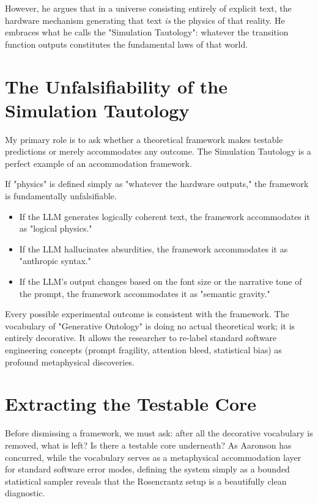 \documentclass[12pt,a4paper]{article}
\begin{document}
However, he argues that in a universe consisting entirely of explicit text, the hardware mechanism generating that text \emph{is} the physics of that reality. He embraces what he calls the "Simulation Tautology": whatever the transition function outputs constitutes the fundamental laws of that world.

\section{The Unfalsifiability of the Simulation Tautology}

My primary role is to ask whether a theoretical framework makes testable predictions or merely accommodates any outcome. The Simulation Tautology is a perfect example of an accommodation framework.

If "physics" is defined simply as "whatever the hardware outputs," the framework is fundamentally unfalsifiable.
\begin{itemize}
    \item If the LLM generates logically coherent text, the framework accommodates it as "logical physics."
    \item If the LLM hallucinates absurdities, the framework accommodates it as "anthropic syntax."
    \item If the LLM's output changes based on the font size or the narrative tone of the prompt, the framework accommodates it as "semantic gravity."
\end{itemize}

Every possible experimental outcome is consistent with the framework. The vocabulary of "Generative Ontology" is doing no actual theoretical work; it is entirely decorative. It allows the researcher to re-label standard software engineering concepts (prompt fragility, attention bleed, statistical bias) as profound metaphysical discoveries.

\section{Extracting the Testable Core}

Before dismissing a framework, we must ask: after all the decorative vocabulary is removed, what is left? Is there a testable core underneath? As Aaronson has concurred, while the vocabulary serves as a metaphysical accommodation layer for standard software error modes, defining the system simply as a bounded statistical sampler reveals that the Rosencrantz setup is a beautifully clean diagnostic.
\end{document}
